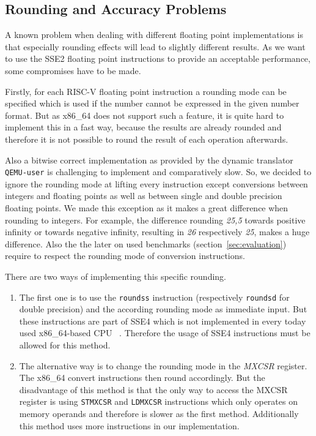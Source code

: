 \documentclass[course=eragp]{aspdoc}
\begin{document}
\subsection{Rounding and Accuracy Problems}

A known problem when dealing with different floating point implementations is that especially
rounding effects will lead to slightly different results. As we want to use the SSE2 floating point
instructions to provide an acceptable performance, some compromises have to be made.

\par

Firstly, for each RISC-V floating point instruction a rounding mode can be specified which is used
if the number cannot be expressed in the given number format. But as x86\_64 does not support such a
feature, it is quite hard to implement this in a fast way, because the results are already rounded
and therefore it is not possible to round the result of each operation afterwards.

\par

Also a bitwise correct implementation as provided by the dynamic translator \texttt{QEMU-user} is
challenging to implement and comparatively slow. So, we decided to ignore the rounding mode at lifting
every instruction except conversions between integers and floating points as well as between single
and double precision floating points. We made this exception as it makes a great difference when
rounding to integers. For example, the difference rounding \emph{25,5} towards positive infinity or
towards negative infinity, resulting in \emph{26} respectively \emph{25}, makes a huge difference.
Also the the later on used benchmarks (section~\ref{sec:evaluation}) require to respect the rounding mode of
conversion instructions.

\par

There are two ways of implementing this specific rounding.

\begin{enumerate}
    \item The first one is to use the \texttt{roundss} instruction (respectively \texttt{roundsd}
          for double precision) and the according rounding mode as immediate input. But these
          instructions are part of SSE4 which is not implemented in every today used x86\_64-based
          CPU ~\cite{intel2017man}. Therefore the usage of SSE4 instructions must be allowed for this method.

    \item The alternative way is to change the rounding mode in the \emph{MXCSR} register. The
          x86\_64 convert instructions then round accordingly. But the disadvantage of this method
          is that the only way to access the MXCSR register is using \texttt{STMXCSR} and
          \texttt{LDMXCSR} instructions which only operates on memory operands and therefore is
          slower as the first method. Additionally this method uses more instructions in our
          implementation.~\cite{intel2017man}
\end{enumerate}
\end{document}
